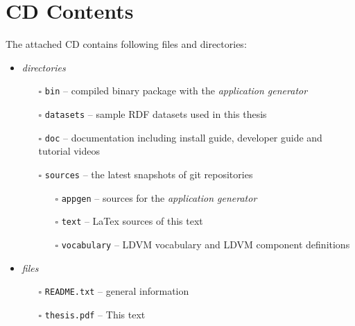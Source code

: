 \chapter{CD Contents}

The attached CD contains following files and directories:

\begin{itemize}
\item \emph{directories}
\begin{itemize}
\item[$\square$] \texttt{bin} -- compiled binary package with the \emph{application generator}
\item[$\square$] \texttt{datasets} -- sample RDF datasets used in this thesis
\item[$\square$] \texttt{doc} -- documentation including install guide, developer guide and tutorial videos
\item[$\square$] \texttt{sources} -- the latest snapshots of  git repositories
\begin{itemize}
\item[$\square$] \texttt{appgen} -- sources for the \emph{application generator}
\item[$\square$] \texttt{text} -- LaTex sources of this text
\item[$\square$] \texttt{vocabulary} -- LDVM vocabulary and LDVM component definitions
\end{itemize}
\end{itemize}
\item \emph{files}
\begin{itemize}
\item[$\square$] \texttt{README.txt} -- general information
\item[$\square$] \texttt{thesis.pdf} -- This text
\end{itemize}
\end{itemize}
